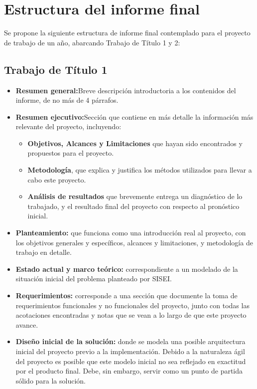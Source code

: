 \section{Estructura del informe final}
Se propone la siguiente estructura de informe final contemplado para el proyecto de trabajo de un año, abarcando Trabajo de Título 1 y 2:

\subsection*{Trabajo de Título 1}
\begin{itemize}
	\item \textbf{Resumen general:}Breve descripción introductoria a los contenidos del informe, de no más de 4 párrafos.
	\item \textbf{Resumen ejecutivo:}Sección que contiene en más detalle la información más relevante del proyecto, incluyendo:
	      \begin{itemize}
		      \item \textbf{Objetivos, Alcances y Limitaciones} que hayan sido encontrados y propuestos para el proyecto.
		      \item \textbf{Metodología}, que explica y justifica los métodos utilizados para llevar a cabo este proyecto.
		      \item \textbf{Análisis de resultados} que brevemente entrega un diagnóstico de lo trabajado, y el resultado final del proyecto con respecto al pronóstico inicial.
	      \end{itemize}
	\item \textbf{Planteamiento:} que funciona como una introducción real al proyecto, con los objetivos generales y específicos, alcances y limitaciones, y metodología de trabajo en detalle.
	\item \textbf{Estado actual y marco teórico:} correspondiente a un modelado de la situación inicial del problema planteado por SISEI.
	\item \textbf{Requerimientos:} corresponde a una sección que documente la toma de requerimientos funcionales y no funcionales del proyecto, junto con todas las acotaciones encontradas y notas que se vean a lo largo de que este proyecto avance.
	\item \textbf{Diseño inicial de la solución:} donde se modela una posible arquitectura inicial del proyecto previo a la implementación. Debido a la naturaleza ágil del proyecto es posible que este modelo inicial no sea reflejado en exactitud por el producto final. Debe, sin embargo, servir como un punto de partida sólido para la solución.
\end{itemize}

